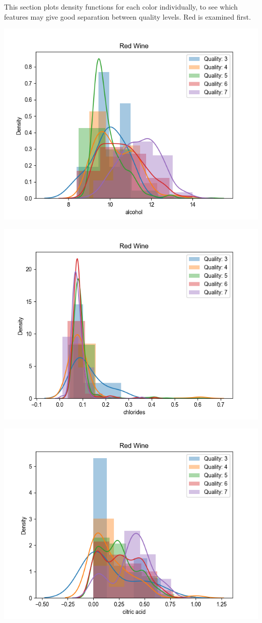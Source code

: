 \documentclass[12pt, letterpaper]{article}
\begin{document}
This section plots density functions for each color individually, to see which features may give good separation between quality levels. Red is examined first.

\includegraphics[scale=\myscale]{red_quality_dist_alcohol.png}

\includegraphics[scale=\myscale]{red_quality_dist_chlorides.png}

\includegraphics[scale=\myscale]{red_quality_dist_citric_acid.png}
\end{document}
